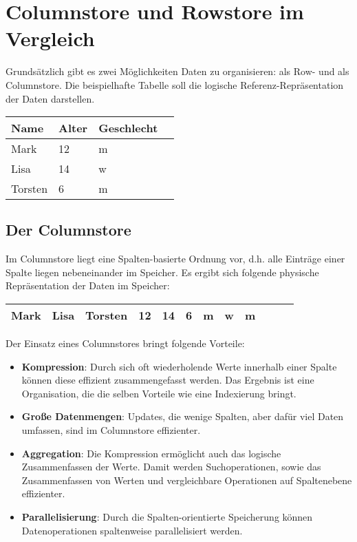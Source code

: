 \chapter{Columnstore und Rowstore im Vergleich}

Grundsätzlich gibt es zwei Möglichkeiten Daten zu organisieren: als Row- und als Columnstore. Die beispielhafte Tabelle soll die logische Referenz-Repräsentation der Daten darstellen.

\begin{center}
    \begin{tabular}{ | l | l | l | l |}
    \hline
    Name & Alter & Geschlecht \\ \hline
    Mark & 12 & m \\ \hline
    Lisa & 14 & w \\ \hline
    Torsten & 6 & m \\ \hline
    \end{tabular}
\end{center}

\section{Der Columnstore}
\label{sec:col_store}
Im Columnstore liegt eine Spalten-basierte Ordnung vor, d.h. alle Einträge einer Spalte liegen nebeneinander im Speicher. Es ergibt sich folgende physische Repräsentation der Daten im Speicher: 

\begin{center}
    \begin{tabular}{ | l | l | l | l | l | l | l | l | l | l | l | l |}
    \hline
    Mark & Lisa & Torsten & 12 & 14 & 6 & m & w & m \\ \hline
    \end{tabular}
\end{center}

Der Einsatz eines Columnstores bringt folgende Vorteile: 

\begin{itemize}
	\item \textbf{Kompression}: Durch sich oft wiederholende Werte innerhalb einer Spalte können diese effizient zusammengefasst werden. Das Ergebnis ist eine Organisation, die die selben Vorteile wie eine Indexierung bringt. 
    \item \textbf{Große Datenmengen}: Updates, die wenige Spalten, aber dafür viel Daten umfassen, sind im Columnstore effizienter. 
	\item \textbf{Aggregation}: Die Kompression ermöglicht auch das  logische Zusammenfassen der Werte. Damit werden Suchoperationen, sowie das Zusammenfassen von Werten und vergleichbare Operationen auf Spaltenebene effizienter. 
    \item \textbf{Parallelisierung}: Durch die Spalten-orientierte Speicherung können Datenoperationen spaltenweise parallelisiert werden. 
\end{itemize}

